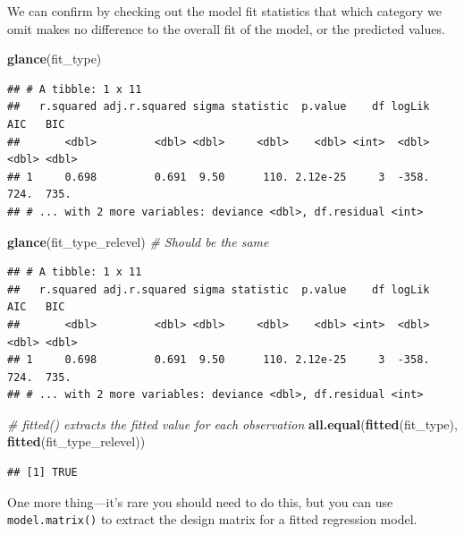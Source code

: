 \documentclass[
  12pt,
  oneside,openany]{book}
\newenvironment{Shaded}{\begin{snugshade}}{\end{snugshade}}
\newcommand{\CommentTok}[1]{\textcolor[rgb]{0.56,0.35,0.01}{\textit{#1}}}
\newcommand{\KeywordTok}[1]{\textcolor[rgb]{0.13,0.29,0.53}{\textbf{#1}}}
\newcommand{\NormalTok}[1]{#1}
\begin{document}
We can confirm by checking out the model fit statistics that which category we omit makes no difference to the overall fit of the model, or the predicted values.

\begin{Shaded}
\begin{Highlighting}[]
\KeywordTok{glance}\NormalTok{(fit\_type)}
\end{Highlighting}
\end{Shaded}

\begin{verbatim}
## # A tibble: 1 x 11
##   r.squared adj.r.squared sigma statistic  p.value    df logLik   AIC   BIC
##       <dbl>         <dbl> <dbl>     <dbl>    <dbl> <int>  <dbl> <dbl> <dbl>
## 1     0.698         0.691  9.50      110. 2.12e-25     3  -358.  724.  735.
## # ... with 2 more variables: deviance <dbl>, df.residual <int>
\end{verbatim}

\begin{Shaded}
\begin{Highlighting}[]
\KeywordTok{glance}\NormalTok{(fit\_type\_relevel)  }\CommentTok{\# Should be the same}
\end{Highlighting}
\end{Shaded}

\begin{verbatim}
## # A tibble: 1 x 11
##   r.squared adj.r.squared sigma statistic  p.value    df logLik   AIC   BIC
##       <dbl>         <dbl> <dbl>     <dbl>    <dbl> <int>  <dbl> <dbl> <dbl>
## 1     0.698         0.691  9.50      110. 2.12e-25     3  -358.  724.  735.
## # ... with 2 more variables: deviance <dbl>, df.residual <int>
\end{verbatim}

\begin{Shaded}
\begin{Highlighting}[]
\CommentTok{\# fitted() extracts the fitted value for each observation}
\KeywordTok{all.equal}\NormalTok{(}\KeywordTok{fitted}\NormalTok{(fit\_type), }\KeywordTok{fitted}\NormalTok{(fit\_type\_relevel))}
\end{Highlighting}
\end{Shaded}

\begin{verbatim}
## [1] TRUE
\end{verbatim}

One more thing---it's rare you should need to do this, but you can use \texttt{model.matrix()} to extract the design matrix for a fitted regression model.
\end{document}
